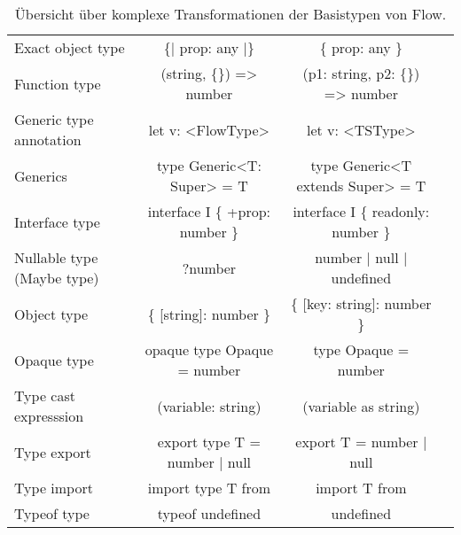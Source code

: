 \begin{table}[tbh]
  \footnotesize
  \begin{tabu} to 
    \midrule
         &                &                & {} \\
    \midrule
    Exact object type          & \{| prop: any |\}                &   \{ prop: any \}                      & {} \\
    Function type              & (string, \{\}) => number         &   (p1: string, p2: \{\}) => number     & {} \\
    Generic type annotation    & let v: <{}FlowType>{}            &   let v: <{}TSType>{}                  & {} \\
    Generics                   & type Generic<{}T: Super> = T     &   type Generic<{}T extends Super> = T  & {} \\
    Interface type             & interface I \{ +prop: number \}  &   interface I \{ readonly: number \}     & {} \\
    Nullable type (Maybe type) & ?number                          &   number | null | undefined            & {} \\
    Object type                & \{ {[}string{]}: number \}       &   \{ {[}key: string{]}: number \}      & {} \\
    Opaque type                & opaque type Opaque = number      &   type Opaque = number                 & {} \\
    Type cast expresssion      & (variable: string)               &   (variable as string)                 & {} \\
    Type export                & export type T = number | null    &   export T = number | null             & {} \\
    Type import                & import type T from  &   import T from           & {} \\
    Typeof type                & typeof undefined                 &   undefined                            & {} \\
    \midrule
  \end{tabu}
  \caption{Übersicht über komplexe Transformationen der Basistypen von Flow.}
  \label{tab:transformation-base-types-complex}
\end{table}
